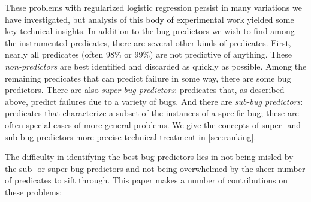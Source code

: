 \documentclass[final]{sigplanconf}
\newcommand{\termdef}[1]{\emph{#1}}
\begin{document}
These problems with regularized logistic regression persist in many variations
we have investigated, but analysis of this body of experimental work yielded some
key technical insights.  In addition to the bug predictors we wish to
find among the instrumented predicates, there are several other kinds
of predicates.  First, nearly all predicates (often 98\% or 99\%) are
not predictive of anything.  These \termdef{non-predictors} are best identified and discarded as
quickly as possible. Among the remaining predicates that can
predict failure in some way, there are some bug predictors.
There are also \termdef{super-bug predictors}: predicates that, as
described above, predict failures due to a variety of bugs.  And there
are \termdef{sub-bug predictors}: predicates that characterize a subset of
the instances of a specific bug; these are often special cases of more
general problems.  We give the concepts of super- and sub-bug
predictors more precise technical treatment in
\autoref{sec:ranking}.

The difficulty in identifying the best bug predictors lies in not being
misled by the sub- or super-bug predictors and not being overwhelmed
by the sheer number of predicates to sift through.
This paper makes a number of contributions on these problems:
\end{document}
